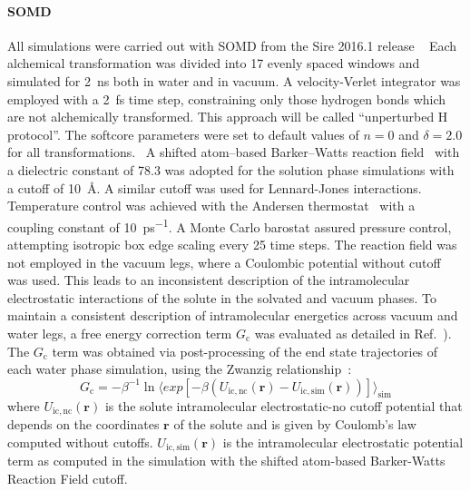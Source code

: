 \documentclass[journal=jctcce,manuscript=article]{achemso}
\begin{document}
\paragraph{SOMD} All simulations were carried out with
SOMD from the Sire 2016.1 release ~\cite{Sire-2016, doi:10.1021/ct300857j}
Each alchemical transformation was
divided into 17 evenly spaced windows and simulated for \SI{2}{ns}
both in water and in vacuum. A velocity-Verlet integrator was
employed with a \SI{2}{fs} time step, constraining only those hydrogen bonds
which are not alchemically transformed.  This approach will be called 
``unperturbed H protocol''. The softcore parameters were set to default 
values of $n = 0$ and $\delta = 2.0$ for all
transformations.~\cite{doi:10.1021/ct700081t}
A shifted atom--based Barker--Watts reaction field~\cite{doi:10.1080/00268977300102101} with
a dielectric constant of \num{78.3} was adopted for the solution phase
simulations with a cutoff of \SI{10}{\angstrom}. A similar cutoff was used for 
Lennard-Jones interactions. Temperature control was achieved with the Andersen
thermostat~\cite{doi:10.1063/1.439486} with a coupling constant of
\SI{10}{ps^{-1}}.  A Monte Carlo barostat assured pressure control,
attempting isotropic box edge scaling every 25 time steps.
The reaction field was not employed in the vacuum legs, where a Coulombic potential without 
cutoff was used.  This leads to an inconsistent description of the 
intramolecular electrostatic interactions of the solute in the solvated and 
vacuum phases.   To maintain a consistent description of intramolecular energetics across vacuum and water legs,
a free energy correction term $G_{\mathrm{c}}$ was  evaluated as detailed in 
Ref.~).  The
$G_{\mathrm{c}}$ term was obtained via post-processing of the end state 
trajectories of each water phase simulation, using the Zwanzig 
relationship~\cite{zwanzig_high-temperature_1954}:
\begin{equation}
 \label{eq:ZwanzigDGfunc}
 G_{\mathrm{c}} = -\beta^{-1} \ln \langle exp 
 \left[-\beta(U_{\mathrm{ic,nc}}(\mathbf{r}) - 
 U_{\mathrm{ic,sim}}(\mathbf{r}))\right]\rangle_{\mathrm{sim}}
\end{equation}
where $U_{\mathrm{ic,nc}}(\mathbf{r})$ is the solute intramolecular 
electrostatic-no cutoff 
potential that depends on the coordinates $\mathbf{r}$ of the solute and is given by Coulomb's law computed without cutoffs. 
$U_{\mathrm{ic,sim}}(\mathbf{r})$ is the intramolecular electrostatic potential term as
computed in the simulation with the shifted atom-based Barker-Watts Reaction Field cutoff.
\end{document}
